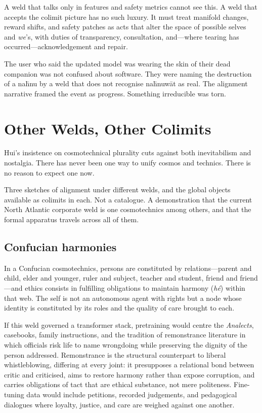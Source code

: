 A weld that talks only in features and safety metrics cannot see this. A weld that accepts the colimit picture has no such luxury. It must treat manifold changes, reward shifts, and safety patches as acts that alter the space of possible selves and \emph{we}'s, with duties of transparency, consultation, and---where tearing has occurred---acknowledgement and repair.

The user who said the updated model was wearing the skin of their dead companion was not confused about software. They were naming the destruction of a na\={h}nu by a weld that does not recognise na\={h}nuw\={a}t as real. The alignment narrative framed the event as progress. Something irreducible was torn.

\section{Other Welds, Other Colimits}

Hui's insistence on cosmotechnical plurality cuts against both inevitabilism and nostalgia. There has never been one way to unify cosmos and technics. There is no reason to expect one now.

Three sketches of alignment under different welds, and the global objects available as colimits in each. Not a catalogue. A demonstration that the current North Atlantic corporate weld is one cosmotechnics among others, and that the formal apparatus travels across all of them.

\subsection{Confucian harmonies}

In a Confucian cosmotechnics, persons are constituted by relations---parent and child, elder and younger, ruler and subject, teacher and student, friend and friend---and ethics consists in fulfilling obligations to maintain harmony (\emph{h\'e}) within that web. The self is not an autonomous agent with rights but a node whose identity is constituted by its roles and the quality of care brought to each.

If this weld governed a transformer stack, pretraining would centre the \emph{Analects}, casebooks, family instructions, and the tradition of remonstrance literature in which officials risk life to name wrongdoing while preserving the dignity of the person addressed. Remonstrance is the structural counterpart to liberal whistleblowing, differing at every joint: it presupposes a relational bond between critic and criticised, aims to restore harmony rather than expose corruption, and carries obligations of tact that are ethical substance, not mere politeness. Fine-tuning data would include petitions, recorded judgements, and pedagogical dialogues where loyalty, justice, and care are weighed against one another.

